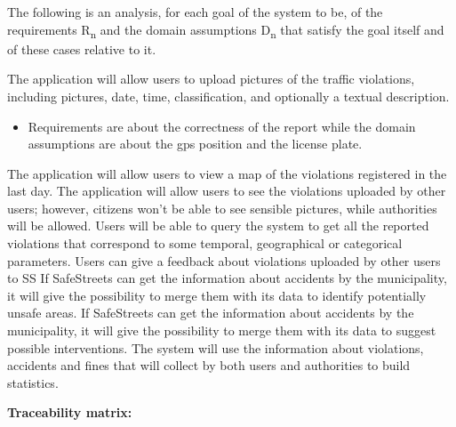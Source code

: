 \documentclass[../RASD.tex]{subfiles}
\begin{document}
    The following is an analysis, for each goal of the system to be, of the requirements R\textsubscript{n} and the domain assumptions D\textsubscript{n} that satisfy the goal itself and of these cases relative to it.
    \begin{enumerate}
         The application will allow users to upload pictures of the traffic violations, including pictures, date, time, classification, and optionally a textual description.
            \begin{itemize}
                \requirement{} 1,2,3,4,5,6,9,14,15,16,17,18,19,20,21,26
                \assumption{} 1,4
                \item Requirements are about the correctness of the report while the domain assumptions are about the gps position and the license plate.
            \end{itemize}
         The application will allow users to view a map of the violations registered in the last day.
         The application will allow users to see the violations uploaded by other users; however, citizens won’t be able to see sensible pictures, while authorities will be allowed.
         Users will be able to query the system to get all the reported violations that correspond to some temporal, geographical or categorical parameters.
         Users can give a feedback about violations uploaded by other users to SS
         If SafeStreets can get the information about accidents by the municipality, it will give the possibility to merge them with its data to identify potentially unsafe areas.
         If SafeStreets can get the information about accidents by the municipality, it will give the possibility to merge them with its data to suggest possible interventions.
         The system will use the information about violations, accidents and fines that will collect by both users and authorities to build statistics.
    \end{enumerate}
    \newpage
    \textbf{Traceability matrix:}
\end{document}
